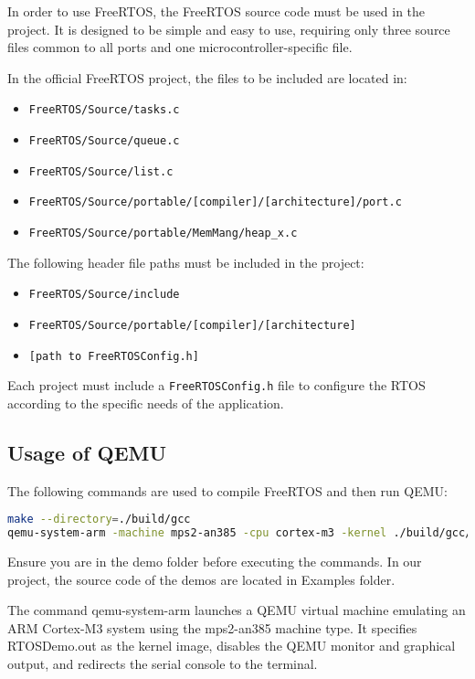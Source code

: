 \documentclass[a4paper, 10pt, oneside]{article} %
\begin{document}
In order to use FreeRTOS, the FreeRTOS source code must be used in the project. It is designed to be simple and easy to use, requiring only three source files common to all ports and one microcontroller-specific file.

In the official FreeRTOS project, the files to be included are located in:
\begin{itemize}
    \item \texttt{FreeRTOS/Source/tasks.c}
    \item \texttt{FreeRTOS/Source/queue.c}
    \item \texttt{FreeRTOS/Source/list.c}
    \item \texttt{FreeRTOS/Source/portable/[compiler]/[architecture]/port.c}
    \item \texttt{FreeRTOS/Source/portable/MemMang/heap\_x.c}
\end{itemize}

The following header file paths must be included in the project:
\begin{itemize}
    \item \texttt{FreeRTOS/Source/include}
    \item \texttt{FreeRTOS/Source/portable/[compiler]/[architecture]}
    \item \texttt{[path to FreeRTOSConfig.h]}
\end{itemize}

Each project must include a \texttt{FreeRTOSConfig.h} file to configure the RTOS according to the specific needs of the application.

\subsection{Usage of QEMU}

The following commands are used to compile FreeRTOS and then run QEMU:
\begin{lstlisting}[language=bash]
make --directory=./build/gcc
qemu-system-arm -machine mps2-an385 -cpu cortex-m3 -kernel ./build/gcc/output/RTOSDemo.out -monitor none -nographic -serial stdio
\end{lstlisting}
Ensure you are in the demo folder before executing the commands. In our project, the source code of the demos are located in Examples folder.

The command qemu-system-arm launches a QEMU virtual machine emulating an ARM Cortex-M3 system using the mps2-an385 machine type. It specifies RTOSDemo.out as the kernel image, disables the QEMU monitor and graphical output, and redirects the serial console to the terminal.
\end{document}
